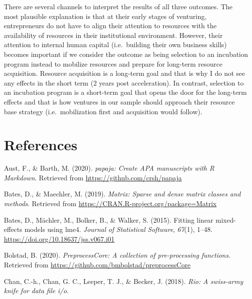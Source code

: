 \documentclass[
  english,
  man]{apa6}
\begin{document}
There are several channels to interpret the results of all three outcomes. The most plausible explanation is that at their early stages of venturing, entrepreneurs do not have to align their attention to resources with the availability of resources in their institutional environment. However, their attention to internal human capital (i.e.~building their own business skills) becomes important if we consider the outcome as being selection to an incubation program instead to mobilize resources and prepare for long-term resource acquisition. Resource acquisition is a long-term goal and that is why I do not see any effects in the short term (2 years post acceleration). In contrast, selection to an incubation program is a short-term goal that opens the door for the long-term effects and that is how ventures in our sample should approach their resource base strategy (i.e.~mobilization first and acquisition would follow).

\newpage

\hypertarget{references}{%
\section{References}\label{references}}

\begingroup
\setlength{\parindent}{-0.5in}
\setlength{\leftskip}{0.5in}

\hypertarget{refs}{}
\leavevmode\hypertarget{ref-R-papaja}{}%
Aust, F., \& Barth, M. (2020). \emph{papaja: Create APA manuscripts with R Markdown}. Retrieved from \url{https://github.com/crsh/papaja}

\leavevmode\hypertarget{ref-R-Matrix}{}%
Bates, D., \& Maechler, M. (2019). \emph{Matrix: Sparse and dense matrix classes and methods}. Retrieved from \url{https://CRAN.R-project.org/package=Matrix}

\leavevmode\hypertarget{ref-R-lme4}{}%
Bates, D., Mächler, M., Bolker, B., \& Walker, S. (2015). Fitting linear mixed-effects models using lme4. \emph{Journal of Statistical Software}, \emph{67}(1), 1--48. \url{https://doi.org/10.18637/jss.v067.i01}

\leavevmode\hypertarget{ref-R-preprocessCore}{}%
Bolstad, B. (2020). \emph{PreprocessCore: A collection of pre-processing functions}. Retrieved from \url{https://github.com/bmbolstad/preprocessCore}

\leavevmode\hypertarget{ref-R-rio}{}%
Chan, C.-h., Chan, G. C., Leeper, T. J., \& Becker, J. (2018). \emph{Rio: A swiss-army knife for data file i/o}.
\end{document}
